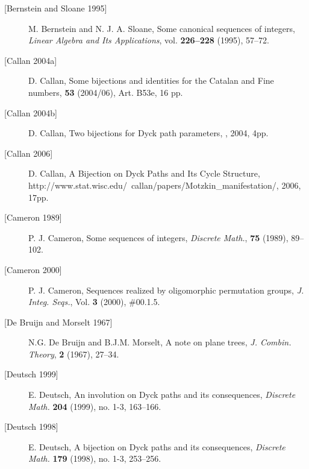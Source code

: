 \documentclass[11pt]{article} %
\begin{document}
\begin{description}

\item[{[Bernstein and Sloane 1995]}]
M. Bernstein and N. J. A. Sloane,
Some canonical sequences of integers,
{\em Linear Algebra and Its Applications}, vol. {\bf 226--228} (1995),
57--72.

\item[{[Callan 2004a]}]
D. Callan, Some bijections and identities for the Catalan and Fine numbers,
\textbf{53} (2004/06), Art. B53e, 16 pp. 

\item[{[Callan 2004b]}]
D. Callan, Two bijections for Dyck path parameters,
, 2004, 4pp.

\item[{[Callan 2006]}]
D. Callan, A Bijection on Dyck Paths and Its Cycle Structure,
\newline
{}
{http://www.stat.wisc.edu/~callan/papers/Motzkin_manifestation/}, 2006, 17pp.


\item[{[Cameron 1989]}]
P. J. Cameron,
Some sequences of integers,
{\em Discrete Math.}, {\bf 75} (1989), 89--102.

\item[{[Cameron 2000]}]
P. J. Cameron,
Sequences realized by oligomorphic permutation groups,
{\em J. Integ. Seqs.}, Vol. {\bf 3} (2000), \#00.1.5.

\item[{[De Bruijn and Morselt 1967]}]
N.G. De Bruijn and B.J.M. Morselt,
A note on plane trees,
{\em J. Combin. Theory}, {\bf 2} (1967), 27--34.


\item[{[Deutsch 1999]}]
E. Deutsch, An involution on Dyck paths and its consequences,
 \emph{Discrete Math.} \textbf{204} (1999), no. 1-3, 163--166. 
 
\item[{[Deutsch 1998]}] E. Deutsch, A bijection on Dyck paths and its consequences,
\emph{Discrete Math.} \textbf{179} (1998), no. 1-3, 253--256. 


\end{description}
\end{document}
